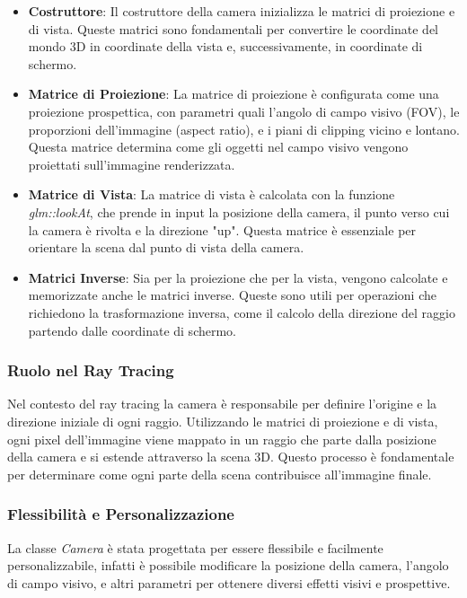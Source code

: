 \documentclass[12pt]{article}
\begin{document}
\begin{itemize}
\item \textbf{Costruttore}: Il costruttore della camera inizializza le matrici di proiezione e di vista. Queste matrici sono fondamentali per convertire le coordinate del mondo 3D in coordinate della vista e, successivamente, in coordinate di schermo.

\item \textbf{Matrice di Proiezione}: La matrice di proiezione è configurata come una proiezione prospettica, con parametri quali l'angolo di campo visivo (FOV), le proporzioni dell'immagine (aspect ratio), e i piani di clipping vicino e lontano. Questa matrice determina come gli oggetti nel campo visivo vengono proiettati sull'immagine renderizzata.

\item \textbf{Matrice di Vista}: La matrice di vista è calcolata con la funzione \textit{glm::lookAt}, che prende in input la posizione della camera, il punto verso cui la camera è rivolta e la direzione "up". Questa matrice è essenziale per orientare la scena dal punto di vista della camera.

\item \textbf{Matrici Inverse}: Sia per la proiezione che per la vista, vengono calcolate e memorizzate anche le matrici inverse. Queste sono utili per operazioni che richiedono la trasformazione inversa, come il calcolo della direzione del raggio partendo dalle coordinate di schermo.
\end{itemize}

\subsubsection{Ruolo nel Ray Tracing}
Nel contesto del ray tracing la camera è responsabile per definire l'origine e la direzione iniziale di ogni raggio. Utilizzando le matrici di proiezione e di vista, ogni pixel dell'immagine viene mappato in un raggio che parte dalla posizione della camera e si estende attraverso la scena 3D. Questo processo è fondamentale per determinare come ogni parte della scena contribuisce all'immagine finale.

\subsubsection{Flessibilità e Personalizzazione}
La classe \textit{Camera} è stata progettata per essere flessibile e facilmente personalizzabile, infatti è possibile modificare la posizione della camera, l'angolo di campo visivo, e altri parametri per ottenere diversi effetti visivi e prospettive.
\end{document}
